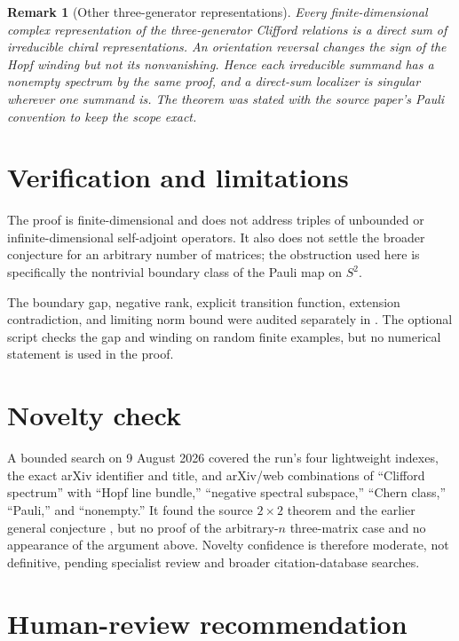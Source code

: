 \documentclass[11pt]{article}
\newtheorem{remark}{Remark}
\newcommand{\1}{I}
\begin{document}
\begin{remark}[Other three-generator representations]
Every finite-dimensional complex representation of the three-generator
Clifford relations is a direct sum of irreducible chiral representations.  An
orientation reversal changes the sign of the Hopf winding but not its
nonvanishing.  Hence each irreducible summand has a nonempty spectrum by the
same proof, and a direct-sum localizer is singular wherever one summand is.
The theorem was stated with the source paper's Pauli convention to keep the
scope exact.
\end{remark}

\section{Verification and limitations}

The proof is finite-dimensional and does not address triples of unbounded or
infinite-dimensional self-adjoint operators.  It also does not settle the
broader conjecture for an arbitrary number of matrices; the obstruction used
here is specifically the nontrivial boundary class of the Pauli map on
$S^2$.

The boundary gap, negative rank, explicit transition function, extension
contradiction, and limiting norm bound were audited separately in
.  The optional script
 checks the gap and winding on
random finite examples, but no numerical statement is used in the proof.

\section{Novelty check}

A bounded search on 9 August 2026 covered the run's four lightweight indexes,
the exact arXiv identifier and title, and arXiv/web combinations of
``Clifford spectrum'' with ``Hopf line bundle,'' ``negative spectral
subspace,'' ``Chern class,'' ``Pauli,'' and ``nonempty.''  It found the source
$2\times2$ theorem \cite{CLL2026} and the earlier general conjecture
\cite{CL2024}, but no proof of the arbitrary-$n$ three-matrix case and no
appearance of the argument above.  Novelty confidence is therefore moderate,
not definitive, pending specialist review and broader citation-database
searches.

\section{Human-review recommendation}
\end{document}
